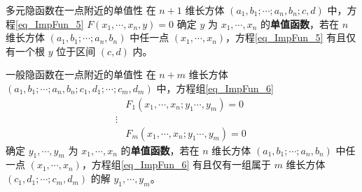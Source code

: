 \begin{definition}{多元隐函数在一点附近的单值性}
在 $n+1$ 维长方体 $(a_1,b_1;\cdots;a_n,b_n;c,d)$ 中，方程\autoref{eq_ImpFun_5} $F(x_1,\cdots,x_n,y)=0$ 确定 $y$ 为 $x_1,\cdots,x_n$ 的\textbf{单值函数}，若在 $n$ 维长方体 $(a_1,b_1;\cdots;a_n,b_n)$ 中任一点 $(x_1,\cdots,x_n)$，方程\autoref{eq_ImpFun_5} 有且仅有一个根 $y$ 位于区间 $(c,d)$ 内。
\end{definition}

\begin{definition}{一般隐函数在一点附近的单值性}
在 $n+m$ 维长方体 $(a_1,b_1;\cdots;a_n,b_n;c_1,d_1;\cdots;c_m,d_m)$ 中，方程组\autoref{eq_ImpFun_6} 
\begin{equation}
\begin{aligned}
&F_1(x_1,\cdots,x_n;y_1\cdots,y_m)=0\\
\vdots\\
&F_m(x_1,\cdots,x_n;y_1\cdots,y_m)=0
\end{aligned}~
\end{equation}
确定 $y_1,\cdots,y_m$ 为 $x_1,\cdots,x_n$ 的\textbf{单值函数}，若在 $n$ 维长方体 $(a_1,b_1;\cdots;a_n,b_n)$ 中任一点 $(x_1,\cdots,x_n)$，方程组\autoref{eq_ImpFun_6} 有且仅有一组属于 $m$ 维长方体 $(c_1,d_1;\cdots;c_m,d_m)$ 的解 $y_1,\cdots,y_m$。
\end{definition}
